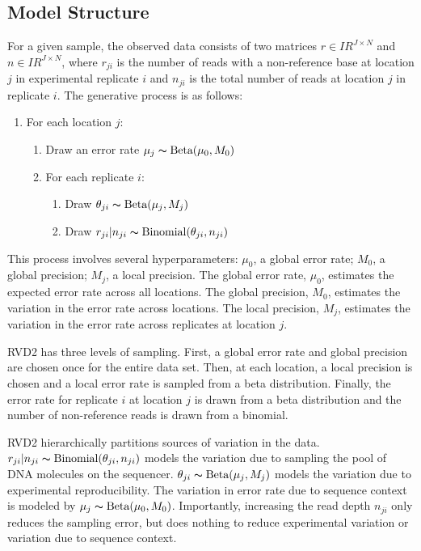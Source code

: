\documentclass[11pt,reqno]{amsart}
\newcommand{\RR}{I\!\!R} %
\begin{document}
\subsection{Model Structure}

For a given sample, the observed data consists of two matrices $r \in \RR^{J \times N}$ and $n \in \RR^{J \times N}$, where $r_{ji}$ is the number of reads with a non-reference base at location $j$ in experimental replicate $i$ and $n_{ji}$ is the total number of reads at location $j$ in replicate $i$. The generative process is as follows:

\begin{enumerate}[noitemsep]
	\item For each location $j$: 
	\begin{enumerate}
		\item Draw an error rate $\mu_j \thicksim \text{Beta}(\mu_0, M_0)$
		\item For each replicate $i$:
		\begin{enumerate}
			\item Draw $\theta_{ji} \thicksim \text{Beta}(\mu_j, M_j)$
			\item Draw $r_{ji} | n_{ji} \thicksim \text{Binomial}(\theta_{ji}, n_{ji})$
		\end{enumerate}
	\end{enumerate}
\end{enumerate}

This process involves several hyperparameters: $\mu_0$, a global error rate; $M_0$, a global precision; $M_j$, a local precision. The global error rate, $\mu_0$, estimates the expected error rate across all locations. The global precision, $M_0$, estimates the variation in the error rate  across locations. The local precision, $M_j$, estimates the variation in the error rate across replicates at location $j$.

RVD2 has three levels of sampling. First, a global error rate and global precision are chosen once for the entire data set. Then, at each location, a local precision is chosen and a local error rate is sampled from a beta distribution. Finally, the error rate for replicate $i$ at location $j$ is drawn from a beta distribution and the number of non-reference reads is drawn from a binomial.

RVD2 hierarchically partitions sources of variation in the data. $r_{ji} | n_{ji} \thicksim \text{Binomial}(\theta_{ji}, n_{ji})$ models the variation due to sampling the pool of DNA molecules on the sequencer. $\theta_{ji} \thicksim \text{Beta}(\mu_j, M_j)$ models the variation due to experimental reproducibility. The variation in error rate due to sequence context is modeled by $\mu_j \thicksim \text{Beta}(\mu_0, M_0)$. Importantly, increasing the read depth $n_{ji}$ only reduces the sampling error, but does nothing to reduce experimental variation or variation due to sequence context.
\end{document}
